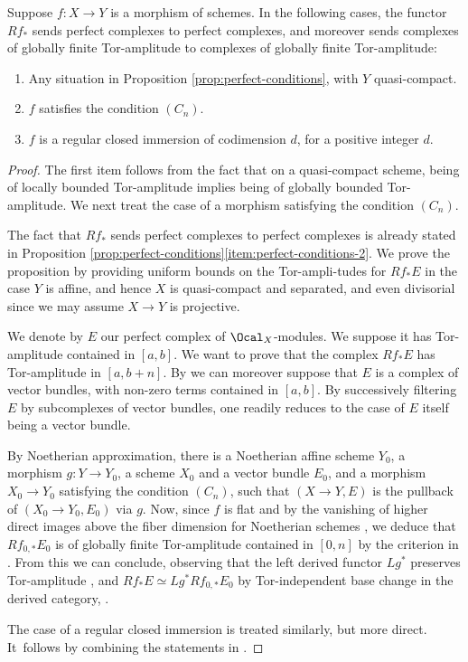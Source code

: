 \begin{proposition}
Suppose $f: X\to Y$ is a morphism of schemes. In the following cases, the functor $Rf_\ast$ sends perfect complexes to perfect complexes, and moreover sends complexes of globally finite Tor-amplitude to complexes of globally finite Tor-amplitude:
\begin{enumerate}
\item Any situation in Proposition \ref{prop:perfect-conditions}, with $Y$ quasi-compact.
\item $f$ satisfies the condition $(C_n)$.
\item $f$ is a regular closed immersion of codimension $d$, for a positive integer $d$.
\end{enumerate}
\end{proposition}
\begin{proof}
The first item follows from the fact that on a quasi-compact scheme, being of locally bounded Tor-amplitude implies being of globally bounded Tor-amplitude. We next treat the case of a morphism satisfying the condition $(C_n)$.

The fact that $Rf_\ast$ sends perfect complexes to perfect complexes is already stated in Proposition \ref{prop:perfect-conditions}\eqref{item:perfect-conditions-2}. We prove the proposition by providing uniform bounds on the Tor-ampli\--tudes for $Rf_\ast E$ in the case $Y$ is affine, and hence $X$ is quasi-compact and separated, and even divisorial since we may assume $X\to Y$ is projective.

We denote by $E$ our perfect complex of $\Ocal_X$-modules. We suppose it has Tor-amplitude contained in $[a,b]$. We want to prove that the complex $Rf_{\ast}E$ has Tor-amplitude in $[a,b+n]$. By \cite[Th.\,2.4.3]{ThomasonTrobaugh} we can moreover suppose that $E$ is a complex of vector bundles, with non-zero terms contained in $[a,b]$. By successively filtering $E$ by subcomplexes of vector bundles, one readily reduces to the case of $E$ itself being a vector bundle.

By Noetherian approximation, there is a Noetherian affine scheme $Y_0$, a morphism $g: Y\to Y_0$, a scheme $X_0$ and a vector bundle $E_0$, and a morphism $X_0 \to Y_0$ satisfying the condition $(C_n)$, such that $(X\to Y, E)$ is the pullback of $(X_0 \to Y_0, E_0)$ via $g$. Now, since $f$ is flat and by the vanishing of higher direct images above the fiber dimension for Noetherian schemes \cite[\href{https://stacks.math.columbia.edu/tag/02V7}{02V7}]{stacks-project}, we deduce that $Rf_{0, \ast} E_0$ is of globally finite Tor-amplitude contained in $[0,n]$ by the criterion in \cite[III, Cor.\,3.7.1]{SGA6}. From this we can conclude, observing that the left derived functor $Lg^\ast$ preserves Tor-amplitude \hbox{\cite[III, Cor.\,3.5.2]{SGA6}}, and $Rf_\ast E \simeq Lg^\ast Rf_{0, \ast} E_0$ by Tor-independent base change in the derived category, \cf \cite[\href{https://stacks.math.columbia.edu/tag/08IB}{08IB}]{stacks-project}.

The case of a regular closed immersion is treated similarly, but more direct. It~follows by combining the statements in \cite[Ex.\,4.1.1, Prop.\,4.4, Cor.\,4.5.1]{SGA6}.
\end{proof}

